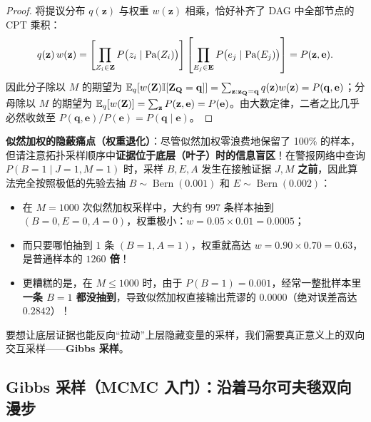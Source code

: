 \begin{proof}
将提议分布 $q(\mathbf{z})$ 与权重 $w(\mathbf{z})$ 相乘，恰好补齐了 DAG 中全部节点的 CPT 乘积：
\[
  q(\mathbf{z})\, w(\mathbf{z})
  = \left[\prod_{Z_i \in \mathbf{Z}} P\big(z_i \mid \operatorname{Pa}(Z_i)\big)\right]
    \left[\prod_{E_j \in \mathbf{E}} P\big(e_j \mid \operatorname{Pa}(E_j)\big)\right]
  = P(\mathbf{z}, \mathbf{e}).
\]
因此分子除以 $M$ 的期望为 $\mathbb{E}_q[w(\mathbf{Z})\mathbb{I}[\mathbf{Z}_{\mathbf{Q}}=\mathbf{q}]] = \sum_{\mathbf{z}:\mathbf{z}_{\mathbf{Q}}=\mathbf{q}} q(\mathbf{z})w(\mathbf{z}) = P(\mathbf{q}, \mathbf{e})$；分母除以 $M$ 的期望为 $\mathbb{E}_q[w(\mathbf{Z})] = \sum_{\mathbf{z}} P(\mathbf{z}, \mathbf{e}) = P(\mathbf{e})$。由大数定律，二者之比几乎必然收敛至 $P(\mathbf{q}, \mathbf{e})/P(\mathbf{e}) = P(\mathbf{q}\mid \mathbf{e})$。
\end{proof}

\textbf{似然加权的隐蔽痛点（权重退化）}：尽管似然加权零浪费地保留了 100\% 的样本，但请注意拓扑采样顺序中\textbf{证据位于底层（叶子）时的信息盲区}！在警报网络中查询 $P(B=1 \mid J=1, M=1)$ 时，采样 $B, E, A$ 发生在接触证据 $J, M$ \textbf{之前}，因此算法完全按照极低的先验去抽 $B \sim \operatorname{Bern}(0.001)$ 和 $E \sim \operatorname{Bern}(0.002)$：
\begin{itemize}
  \item 在 $M = 1000$ 次似然加权采样中，大约有 $997$ 条样本抽到 $(B=0, E=0, A=0)$，权重极小：$w = 0.05 \times 0.01 = 0.0005$；
  \item 而只要哪怕抽到 $1$ 条 $(B=1, A=1)$，权重就高达 $w = 0.90 \times 0.70 = 0.63$，是普通样本的 \textbf{$1260$ 倍}！
  \item 更糟糕的是，在 $M \le 1000$ 时，由于 $P(B=1) = 0.001$，经常一整批样本里\textbf{一条 $B=1$ 都没抽到}，导致似然加权直接输出荒谬的 $0.0000$（绝对误差高达 $0.2842$）！
\end{itemize}
要想让底层证据也能反向“拉动”上层隐藏变量的采样，我们需要真正意义上的双向交互采样——\textbf{Gibbs 采样}。

\subsection{Gibbs 采样（MCMC 入门）：沿着马尔可夫毯双向漫步}


